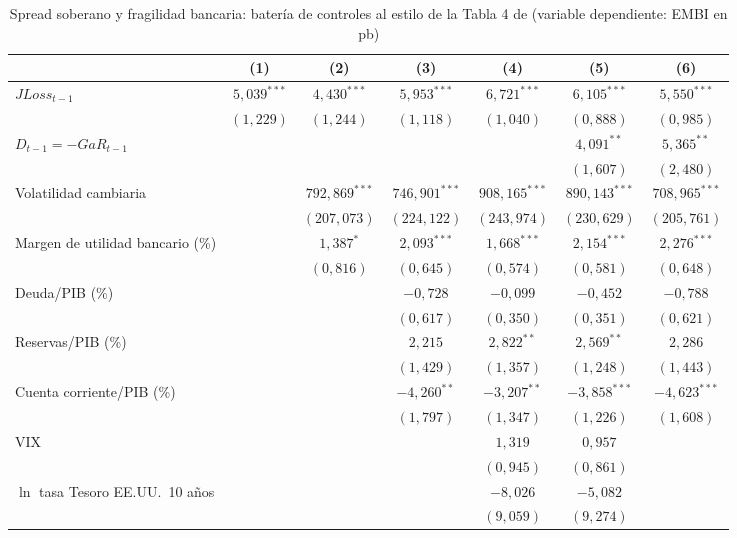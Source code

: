\begin{table}[htbp]
\centering
\footnotesize
\setlength{\tabcolsep}{4pt}
\caption[Batería estilo Chari et al.\ (2024)]{Spread soberano y fragilidad bancaria: batería de controles al estilo de la Tabla 4 de \citet{Chari2024b} (variable dependiente: EMBI en pb)}
\label{tab:chari-arb-nivlag}
\begin{tabular}{lcccccc}
\toprule
 & (1) & (2) & (3) & (4) & (5) & (6) \\
\midrule
$JLoss_{t-1}$ & $5{,}039^{***}$ & $4{,}430^{***}$ & $5{,}953^{***}$ & $6{,}721^{***}$ & $6{,}105^{***}$ & $5{,}550^{***}$ \\
 & $(1{,}229)$ & $(1{,}244)$ & $(1{,}118)$ & $(1{,}040)$ & $(0{,}888)$ & $(0{,}985)$ \\
$D_{t-1}=-GaR_{t-1}$ &  &  &  &  & $4{,}091^{**}$ & $5{,}365^{**}$ \\
 &  &  &  &  & $(1{,}607)$ & $(2{,}480)$ \\
Volatilidad cambiaria &  & $792{,}869^{***}$ & $746{,}901^{***}$ & $908{,}165^{***}$ & $890{,}143^{***}$ & $708{,}965^{***}$ \\
 &  & $(207{,}073)$ & $(224{,}122)$ & $(243{,}974)$ & $(230{,}629)$ & $(205{,}761)$ \\
Margen de utilidad bancario (\%) &  & $1{,}387^{*}$ & $2{,}093^{***}$ & $1{,}668^{***}$ & $2{,}154^{***}$ & $2{,}276^{***}$ \\
 &  & $(0{,}816)$ & $(0{,}645)$ & $(0{,}574)$ & $(0{,}581)$ & $(0{,}648)$ \\
Deuda/PIB (\%) &  &  & $-0{,}728$ & $-0{,}099$ & $-0{,}452$ & $-0{,}788$ \\
 &  &  & $(0{,}617)$ & $(0{,}350)$ & $(0{,}351)$ & $(0{,}621)$ \\
Reservas/PIB (\%) &  &  & $2{,}215$ & $2{,}822^{**}$ & $2{,}569^{**}$ & $2{,}286$ \\
 &  &  & $(1{,}429)$ & $(1{,}357)$ & $(1{,}248)$ & $(1{,}443)$ \\
Cuenta corriente/PIB (\%) &  &  & $-4{,}260^{**}$ & $-3{,}207^{**}$ & $-3{,}858^{***}$ & $-4{,}623^{***}$ \\
 &  &  & $(1{,}797)$ & $(1{,}347)$ & $(1{,}226)$ & $(1{,}608)$ \\
VIX &  &  &  & $1{,}319$ & $0{,}957$ &  \\
 &  &  &  & $(0{,}945)$ & $(0{,}861)$ &  \\
$\ln$ tasa Tesoro EE.UU.\ 10 años &  &  &  & $-8{,}026$ & $-5{,}082$ &  \\
 &  &  &  & $(9{,}059)$ & $(9{,}274)$ &  \\

\end{tabular}
\end{table}
